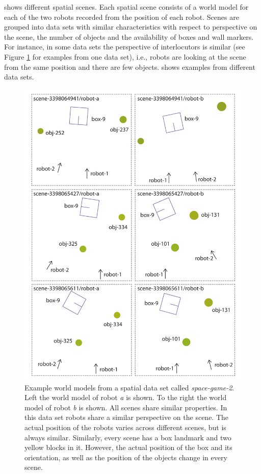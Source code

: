  shows different spatial scenes. Each spatial scene 
consists of a world model for each of the two robots recorded from the position of 
each robot. Scenes are grouped into data sets with similar characteristics
with respect to perspective on the scene, the number of objects and
the availability of boxes and wall markers. For instance, in some data sets the perspective of interlocutors is similar (see Figure \ref{f:spatial-scenes-1} for 
examples from one data set), i.e., robots
are looking at the scene from the same position and there are few objects.
 shows examples from different data sets.

\begin{figure}
\begin{center}
\includegraphics[width=.8\textwidth]{figs/spatial-scenes-overview-1}
\end{center}
\caption[Example world models]{Example world models from a spatial data
set called \emph{space-game-2}. Left the world model of 
robot \emph{a} is shown. To the right the world model of robot 
\emph{b} is shown. All scenes share similar properties. In 
this data set robots share a similar perspective on the scene.
The actual position of the robots varies across different scenes, but is always similar.
Similarly, every scene has a box landmark and two yellow blocks in it. 
However, the actual position of the box and its orientation, as well as the
position of the objects change in every scene.}
\label{f:spatial-scenes-1}
\end{figure}

